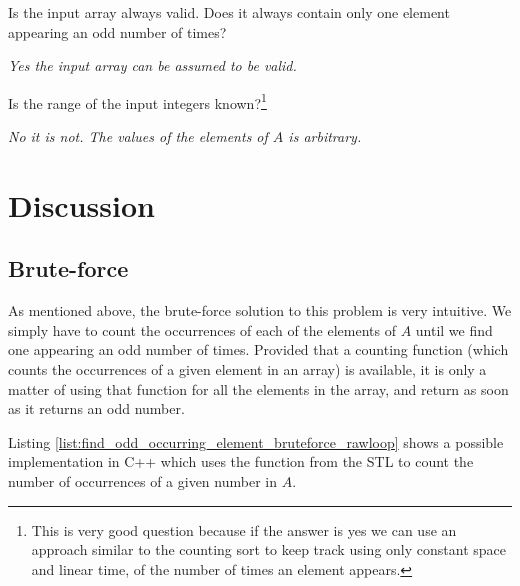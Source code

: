 \begin{QandA}
	\begin{questionitem} \begin{question} Is the input array always valid. Does it always contain only one element appearing an odd number of times?  \end{question} 	 
    \begin{answered}
		\textit{Yes the input array can be assumed to be valid.}
	\end{answered} \end{questionitem}
	\begin{questionitem} \begin{question} Is the range of the input integers known?\footnote{This is very good question because if the answer is yes we can use an approach similar to the counting sort to keep track using only constant space and linear time, of the number of times an element appears.}  \end{question} 	 
    \begin{answered}
		\textit{No it is not. The values of the elements of $A$ is arbitrary.}
	\end{answered} \end{questionitem}
	
\end{QandA}

\section{Discussion}

\subsection{Brute-force}
\label{find_odd_occurring_element:sec:bruteforce}

As mentioned above, the brute-force solution to this problem is very intuitive.  We simply have to count the occurrences of each of the elements of $A$ until we find one appearing an odd number of times.  
Provided that a counting function (which counts the occurrences of a given element in an array) is available, it is only a matter of using that function for all the elements in the array, and return as soon as it returns an odd number. 

Listing \ref{list:find_odd_occurring_element_bruteforce_rawloop} shows a possible implementation in C++ which uses the  function from the STL to count the number of occurrences of a given number in $A$.


